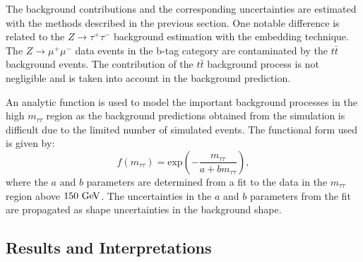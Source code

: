 The background contributions and the corresponding uncertainties are estimated with the methods described in the previous section. One notable difference is related to the $Z \rightarrow\tau^{+}\tau^{-}$ background estimation with the embedding technique. The $Z\rightarrow \mu^{+}\mu^{-}$ data events in the b-tag category are contaminated by the $t\bar{t}$ background events. The contribution of the $t\bar{t}$  background process is not negligible and is taken into account in the background prediction. 

An analytic function is used to model the important background  processes in the high $m_{\tau\tau}$ region as the background predictions obtained from the simulation is difficult due to the  limited number of simulated events. The functional form used is given by:
\begin{equation} \label{eq:fc}
f(m_{\tau\tau}) = \mathrm{exp}\left( -\frac{m_{\tau\tau}}{a+bm_{\tau\tau}}\right),
\end{equation}
where the $a$ and $b$ parameters are determined from a fit to the data in the $m_{\tau\tau}$ region above $150~\mathrm{Ge\kern -0.1em V}$. The uncertainties in the $a$ and $b$ parameters from the fit are propagated as shape uncertainties in the background shape. 

\subsection{Results and Interpretations}

